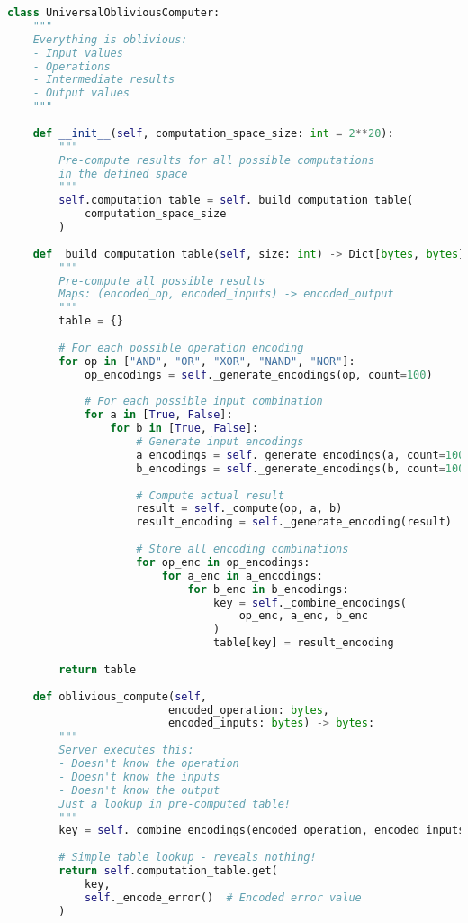\begin{lstlisting}[language=Python, caption={Universal oblivious computation}]
class UniversalObliviousComputer:
    """
    Everything is oblivious:
    - Input values
    - Operations  
    - Intermediate results
    - Output values
    """
    
    def __init__(self, computation_space_size: int = 2**20):
        """
        Pre-compute results for all possible computations
        in the defined space
        """
        self.computation_table = self._build_computation_table(
            computation_space_size
        )
        
    def _build_computation_table(self, size: int) -> Dict[bytes, bytes]:
        """
        Pre-compute all possible results
        Maps: (encoded_op, encoded_inputs) -> encoded_output
        """
        table = {}
        
        # For each possible operation encoding
        for op in ["AND", "OR", "XOR", "NAND", "NOR"]:
            op_encodings = self._generate_encodings(op, count=100)
            
            # For each possible input combination
            for a in [True, False]:
                for b in [True, False]:
                    # Generate input encodings
                    a_encodings = self._generate_encodings(a, count=100)
                    b_encodings = self._generate_encodings(b, count=100)
                    
                    # Compute actual result
                    result = self._compute(op, a, b)
                    result_encoding = self._generate_encoding(result)
                    
                    # Store all encoding combinations
                    for op_enc in op_encodings:
                        for a_enc in a_encodings:
                            for b_enc in b_encodings:
                                key = self._combine_encodings(
                                    op_enc, a_enc, b_enc
                                )
                                table[key] = result_encoding
        
        return table
    
    def oblivious_compute(self,
                         encoded_operation: bytes,
                         encoded_inputs: bytes) -> bytes:
        """
        Server executes this:
        - Doesn't know the operation
        - Doesn't know the inputs
        - Doesn't know the output
        Just a lookup in pre-computed table!
        """
        key = self._combine_encodings(encoded_operation, encoded_inputs)
        
        # Simple table lookup - reveals nothing!
        return self.computation_table.get(
            key,
            self._encode_error()  # Encoded error value
        )
\end{lstlisting}


